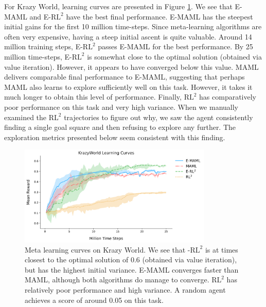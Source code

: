 \documentclass{article} %
\begin{document}
For Krazy World, learning curves are presented in Figure \ref{fig:learning-curves-0}. We see that E-MAML and E-$\text{RL}^2$ have the best final performance. E-MAML has the steepest initial gains for the first 10 million time-steps. Since meta-learning algorithms are often very expensive, having a steep initial ascent is quite valuable. Around 14 million training steps, E-$\text{RL}^2$ passes E-MAML for the best performance. By 25 million time-steps, E-$\text{RL}^2$ is somewhat close to the optimal solution (obtained via value iteration). However, it appears to have converged below this value. MAML delivers comparable final performance to E-MAML, suggesting that perhaps MAML also learns to explore sufficiently well on this task. However, it takes it much longer to obtain this level of performance. Finally, $\text{RL}^2$ has comparatively poor performance on this task and very high variance. When we manually examined the $\text{RL}^2$ trajectories to figure out why, we saw the agent consistently finding a single goal square and then refusing to explore any further. The exploration metrics presented below seem consistent with this finding. 

\begin{figure}[H]
\begin{center}
\includegraphics[width=0.82\textwidth]{ge_curves/KrazyWorld-Learning_Curves.png} 
\end{center}
\caption{Meta learning curves on Krazy World. We see that -$\text{RL}^2$ is at times closest to the optimal solution of 0.6 (obtained via value iteration), but has the highest initial variance. E-MAML converges faster than MAML, although both algorithms do manage to converge. $\text{RL}^2$ has relatively poor performance and high variance. A random agent achieves a score of around 0.05 on this task.}
\label{fig:learning-curves-0}
\end{figure} 
\end{document}
